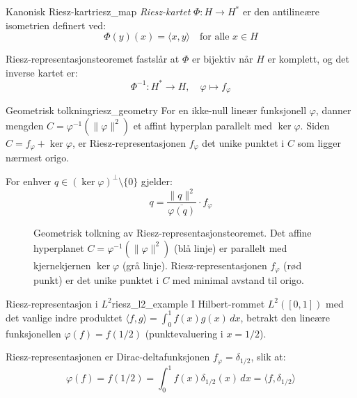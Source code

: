 \begin{definition}{Kanonisk Riesz-kart}{riesz_map}
	\emph{Riesz-kartet} $\Phi : H \to H^\ast$ er den antilineære isometrien definert ved:
	\begin{equation}
		\Phi(y)(x) = \langle x, y \rangle \quad \text{for alle } x \in H
	\end{equation}

	Riesz-representasjonsteoremet fastslår at $\Phi$ er bijektiv når $H$ er komplett, og det inverse kartet er:
	\begin{equation}
		\Phi^{-1} : H^\ast \to H, \quad \varphi \mapsto f_\varphi
	\end{equation}
\end{definition}

\begin{remark}{Geometrisk tolkning}{riesz_geometry}
	For en ikke-null lineær funksjonell $\varphi$, danner mengden $C = \varphi^{-1}(\|\varphi\|^2)$ et affint hyperplan parallelt med $\ker \varphi$. Siden $C = f_\varphi + \ker \varphi$, er Riesz-representasjonen $f_\varphi$ det unike punktet i $C$ som ligger nærmest origo.

	For enhver $q \in (\ker \varphi)^\perp \setminus \{0\}$ gjelder:
	\begin{equation}
		q = \frac{\|q\|^2}{\overline{\varphi(q)}} \cdot f_\varphi
	\end{equation}
\end{remark}

\begin{figure}[h]
	\centering
	
	\caption{Geometrisk tolkning av Riesz-representasjonsteoremet. Det affine hyperplanet $C = \varphi^{-1}(\|\varphi\|^2)$ (blå linje) er parallelt med kjernekjernen $\ker \varphi$ (grå linje). Riesz-representasjonen $f_\varphi$ (rød punkt) er det unike punktet i $C$ med minimal avstand til origo.}
	\label{fig:riesz_representation}
\end{figure}

\begin{example}{Riesz-representasjon i $L^2$}{riesz_l2_example}
	I Hilbert-rommet $L^2([0,1])$ med det vanlige indre produktet $\langle f, g \rangle = \int_0^1 f(x)g(x) \, dx$, betrakt den lineære funksjonellen $\varphi(f) = f(1/2)$ (punktevaluering i $x = 1/2$).

	Riesz-representasjonen er Dirac-deltafunksjonen $f_\varphi = \delta_{1/2}$, slik at:
	\begin{equation}
		\varphi(f) = f(1/2) = \int_0^1 f(x) \delta_{1/2}(x) \, dx = \langle f, \delta_{1/2} \rangle
	\end{equation}
\end{example}

